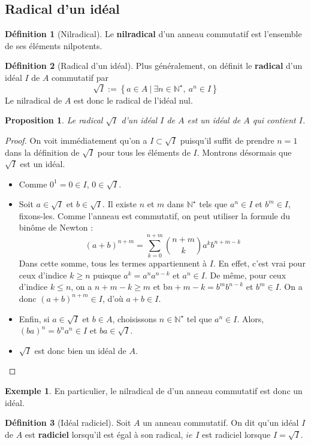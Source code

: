 \documentclass[french]{book}
\newcommand{\N}{\mathbb{N}}
\newcommand{\st}{^\star}
\theoremstyle{plain}
\newtheorem{prop}{Proposition}[chapter]
\theoremstyle{definition}
\newtheorem{dfn}{Définition}[chapter]
\newtheorem{exa}{Exemple}[chapter]
\theoremstyle{remark}
\begin{document}
\subsection{Radical d'un idéal}
\begin{dfn}[Nilradical]
	Le \textbf{nilradical} d'un anneau commutatif est l'ensemble de ses éléments nilpotents.
\end{dfn}
\begin{dfn}[Radical d'un idéal]
	Plus généralement, on définit le \textbf{radical} d'un idéal $I$ de $A$ commutatif par $$\sqrt{I}:=\left\{a\in A\ | \ \exists n\in\N\st,\ a^n\in I\right\}$$ Le nilradical de $A$ est donc le radical de l'idéal nul.
\end{dfn}
\begin{prop}
	Le radical $\sqrt{I}$ d'un idéal $I$ de $A$ est un idéal de $A$ qui contient $I$.
\end{prop}
\begin{proof}
	On voit immédiatement qu'on a $I\subset\sqrt{I}$ puisqu'il suffit de prendre $n=1$ dans la définition de $\sqrt{I}$ pour tous les éléments de $I$. Montrons désormais que $\sqrt{I}$ est un idéal.
	\begin{itemize}
		\item Comme $0^1=0\in I$, $0\in\sqrt{I}$.
		\item Soit $a\in\sqrt{I}$ et $b\in\sqrt{I}$. Il existe $n$ et $m$ dans $\N\st$ tels que $a^n\in I$ et $b^m\in I$, fixons-les. Comme l'anneau est commutatif, on peut utiliser la formule du binôme de Newton : $$(a+b)^{n+m}=\sum_{k=0}^{n+m}\binom{n+m}{k}a^kb^{n+m-k}$$ Dans cette somme, tous les termes appartiennent à $I$. En effet, c'est vrai pour ceux d'indice $k\geqslant n$ puisque $a^k=a^na^{n-k}$ et $a^n\in I$. De même, pour ceux d'indice $k\leqslant n$, on a $n+m-k\geqslant m$ et b${n+m-k}=b^mb^{n-k}$ et $b^m\in I$. On a donc $(a+b)^{n+m}\in I$, d'où $a+b\in I$.
		\item Enfin, si $a\in\sqrt{I}$ et $b\in A$, choisissons $n\in\N\st$ tel que $a^n\in I$. Alors, $(ba)^n=b^na^n\in I$ et $ba\in\sqrt{I}$.
		\item $\sqrt{I}$ est donc bien un idéal de $A$.
	\end{itemize}
\end{proof}
\begin{exa}
	En particulier, le nilradical de d'un anneau commutatif est donc un idéal.
\end{exa}
\begin{dfn}[Idéal radiciel]
	Soit $A$ un anneau commutatif. On dit qu'un idéal $I$ de $A$ est \textbf{radiciel} lorsqu'il est égal à son radical, $ie$ $I$ est radiciel lorsque $I=\sqrt{I}$.
\end{dfn}
\end{document}
